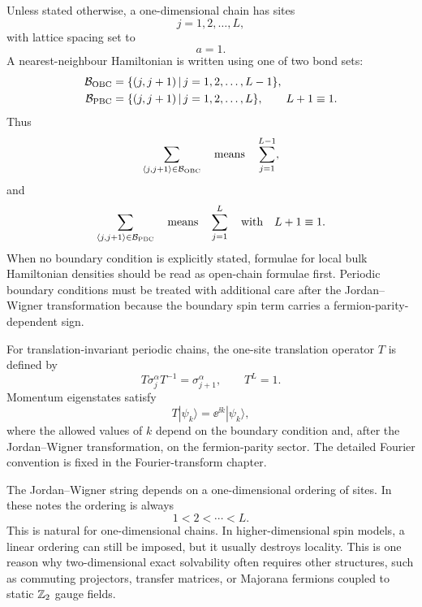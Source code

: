 Unless stated otherwise, a one-dimensional chain has sites
\begin{equation}
    j=1,2,\ldots,L,
\end{equation}
with lattice spacing set to
\begin{equation}
    a=1.
\end{equation}
A nearest-neighbour Hamiltonian is written using one of two bond sets:
\begin{align}
    \mathcal{B}_{\rm OBC}
    &=
    \{(j,j+1)\,|\,j=1,2,\ldots,L-1\},
    \\
    \mathcal{B}_{\rm PBC}
    &=
    \{(j,j+1)\,|\,j=1,2,\ldots,L\},
    \qquad
    L+1\equiv 1.
\end{align}
Thus
\begin{equation}
    \sum_{\langle j,j+1\rangle\in\mathcal{B}_{\rm OBC}}
    \quad\text{means}\quad
    \sum_{j=1}^{L-1},
\end{equation}
and
\begin{equation}
    \sum_{\langle j,j+1\rangle\in\mathcal{B}_{\rm PBC}}
    \quad\text{means}\quad
    \sum_{j=1}^{L}\quad\text{with}\quad L+1\equiv1.
\end{equation}
When no boundary condition is explicitly stated, formulae for local bulk
Hamiltonian densities should be read as open-chain formulae first. Periodic
boundary conditions must be treated with additional care after the Jordan--Wigner
transformation because the boundary spin term carries a fermion-parity-dependent
sign.

For translation-invariant periodic chains, the one-site translation operator $T$
is defined by
\begin{equation}
    T\sigma_j^\alpha T^{-1}=\sigma_{j+1}^\alpha,
    \qquad
    T^L=1.
\end{equation}
Momentum eigenstates satisfy
\begin{equation}
    T|\psi_k\rangle=\ee^{\ii k}|\psi_k\rangle,
\end{equation}
where the allowed values of $k$ depend on the boundary condition and, after the
Jordan--Wigner transformation, on the fermion-parity sector. The detailed Fourier
convention is fixed in the Fourier-transform chapter.

\begin{remark}
The Jordan--Wigner string depends on a one-dimensional ordering of sites. In these
notes the ordering is always
\begin{equation}
    1<2<\cdots<L.
\end{equation}
This is natural for one-dimensional chains. In higher-dimensional spin models, a
linear ordering can still be imposed, but it usually destroys locality. This is one
reason why two-dimensional exact solvability often requires other structures, such
as commuting projectors, transfer matrices, or Majorana fermions coupled to static
$\mathbb{Z}_2$ gauge fields.
\end{remark}

